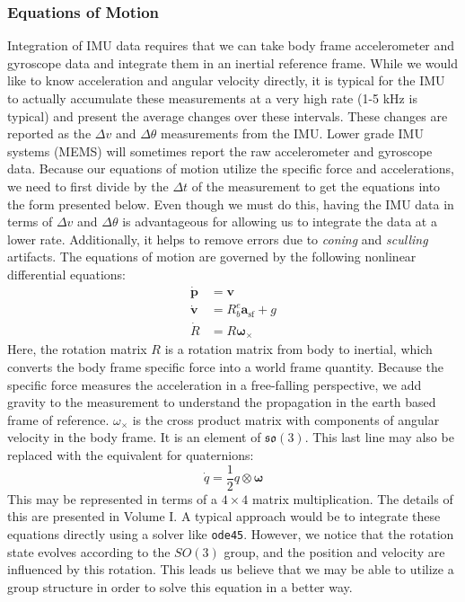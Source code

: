 \subsubsection{Equations of Motion}
Integration of IMU data requires that we can take body frame accelerometer and gyroscope data and integrate them in an inertial reference frame. While we would like to know acceleration and angular velocity directly, it is typical for the IMU to actually accumulate these measurements at a very high rate (1-5 kHz is typical) and present the average changes over these intervals. These changes are reported as the $\Delta v$ and $\Delta\theta$ measurements from the IMU. Lower grade IMU systems (MEMS) will sometimes report the raw accelerometer and gyroscope data. Because our equations of motion utilize the specific force and accelerations, we need to first divide by the $\Delta t$ of the measurement to get the equations into the form presented below. Even though we must do this, having the IMU data in terms of $\Delta v$ and $\Delta \theta$ is advantageous for allowing us to integrate the data at a lower rate. Additionally, it helps to remove errors due to \textit{coning} and \textit{sculling} artifacts. The equations of motion are governed by the following nonlinear differential equations:
\begin{align}
    \bm{\dot{p}}&=\bm{v}\\
    \bm{\dot{v}}&=R_b^e\bm{a}_\text{sf}+g\\
    \dot{R}&=R\bm{\omega}_\times
\end{align}
Here, the rotation matrix $R$ is a rotation matrix from body to inertial, which converts the body frame specific force into a world frame quantity. Because the specific force measures the acceleration in a free-falling perspective, we add gravity to the measurement to understand the propagation in the earth based frame of reference. $\omega_\times$ is the cross product matrix with components of angular velocity in the body frame. It is an element of $\mathfrak{so}(3)$. This last line may also be replaced with the equivalent for quaternions:
$$\dot{q}=\frac{1}{2}q\otimes\bm{\omega}$$
This may be represented in terms of a $4\times4$ matrix multiplication. The details of this are presented in Volume I. A typical approach would be to integrate these equations directly using a solver like \texttt{ode45}. However, we notice that the rotation state evolves according to the $SO(3)$ group, and the position and velocity are influenced by this rotation. This leads us believe that we may be able to utilize a group structure in order to solve this equation in a better way.

